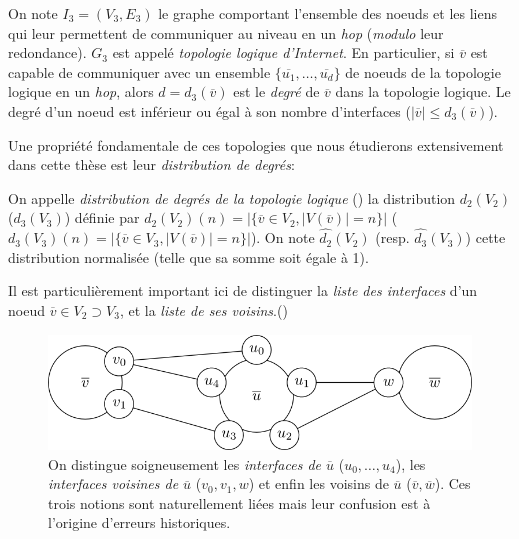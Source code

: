 \begin{definition}
\label{def:topologie-logique}
On note $I_3 = (V_3, E_3)$ le graphe comportant l'ensemble des noeuds \LLL et
les liens qui leur permettent de communiquer au niveau \LLL en un {\em hop}
({\em modulo} leur redondance). $G_3$ est appelé {\em topologie logique
d'Internet}. En particulier, si ${\overline v}$ est capable de communiquer avec
un ensemble $\{\overline{u_1}, \ldots, \overline{u_d}\}$ de noeuds de la
topologie logique en un {\em hop}, alors $d = d_3(\overline{v})$ est le {\em
degré} de ${\overline v}$ dans la topologie logique. Le degré d'un noeud est
inférieur ou égal à son nombre d'interfaces ($|\overline{v}| \leq
d_3(\overline{v})$).
\end{definition}

Une propriété fondamentale de ces topologies que nous étudierons extensivement
dans cette thèse est leur {\em distribution de degrés}:

\begin{definition}
On appelle {\em distribution de degrés de la topologie logique} () la distribution $d_2(V_2)$ (\resp $d_3(V_3)$) définie
par $d_2(V_2)(n) = |\{ \overline{v} \in V_2, |V(\overline{v})| = n \}|$ (\resp
$d_3(V_3)(n) = |\{ \overline{v} \in V_3, |V(\overline{v})| = n \}|$). On note
$\hat{d_2}(V_2)$ (resp. $\hat{d_3}(V_3)$) cette distribution normalisée (telle
que sa somme soit égale à 1).
\end{definition}

Il est particulièrement important ici de distinguer la {\em liste des
interfaces} d'un noeud $\overline{v} \in V_2 \supset V_3$, et la {\em liste de
ses voisins}.()


\begin{figure}[!ht]
\centering
\includegraphics[width=\columnwidth]{images/intro-l2-l3}
\caption[Interfaces et voisins]{On distingue soigneusement les {\em interfaces
de $\overline{u}$} ($u_0, \ldots, u_4$), les {\em interfaces voisines de $\overline{u}$} ($v_0,
v_1, w$) et enfin les voisins de $\overline{u}$ ($\overline{v}, \overline{w}$).
Ces trois notions sont naturellement liées mais leur confusion est à l'origine
d'erreurs historiques.}
\label{fig:intro-l2-l3}
\end{figure}

